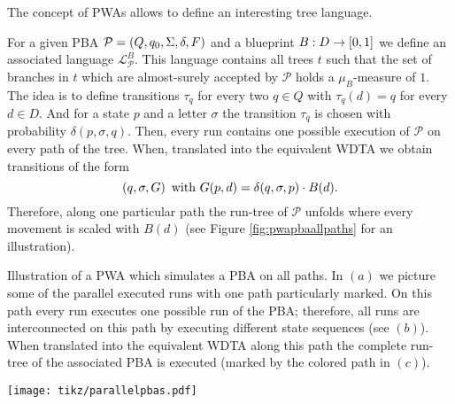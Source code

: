 The concept of \acp{PWA} allows to define an interesting tree language.
\begin{example}
  \cite[Proposition 43]{RandAutoInfTrees}
  For a given \ac{PBA} $\mathcal{P} = \left(Q, q_{0}, \Sigma, \delta, F\right)$ and
  a blueprint $B:D\rightarrow\left[0,1\right]$ we define an associated language 
  $\mathcal{L}_{\mathcal{P}}^{B}$. This language contains all trees $t$ such 
  that the set of branches in $t$ which are almost-surely accepted by 
  $\mathcal{P}$ holds a $\mu_{B}$-measure of $1$. The idea is to define 
  transitions $\tau_{q}$ for every two $q\in Q$ with $\tau_{q}(d) = q$ for 
  every $d\in D$. And for a state $p$ and a letter $\sigma$ the transition 
  $\tau_{q}$ is chosen with probability $\delta(p, \sigma, q)$. Then, every run
  contains one possible execution of $\mathcal{P}$ on every path of the tree.
  When, translated into the equivalent \ac{WDTA} we obtain transitions of the
  form
  \begin{equation*}
    \left(q, \sigma, G\right)\text{ with }G(p,d) = \delta(q,\sigma, p)\cdot B(d).
  \end{equation*}
  Therefore, along one particular path the run-tree of $\mathcal{P}$ unfolds
  where every movement is scaled with $B(d)$ (see Figure 
  \ref{fig:pwapbaallpaths} for an illustration).
\end{example}
\begin{drawing}
  \caption{Illustration of a \ac{PWA} which simulates a \ac{PBA} on all paths. 
  In $(a)$ we picture some of the parallel executed runs with one path 
  particularly marked. On this path every run executes one possible run of the
  \ac{PBA}; therefore, all runs are interconnected on this path by executing 
  different state sequences (see $(b)$). When translated into the equivalent
  \ac{WDTA} along this path the complete run-tree of the associated
  \ac{PBA} is executed (marked by the colored path in $(c)$).}
  \label{fig:pwapbaallpaths}
  \begin{center}
    \texttt{[image: tikz/parallelpbas.pdf]}
  \end{center}
\end{drawing}

